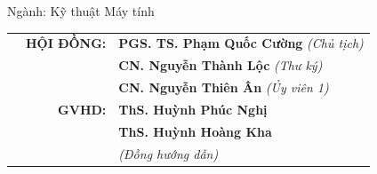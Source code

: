 \begin{titlepage}
\begin{center}
        \vspace{1em}
        
        {\fontsize{15pt}{18pt}\selectfont Ngành: Kỹ thuật Máy tính}

        \vspace{1cm}

        \begin{table}[h]
            \centering
            \fontsize{15pt}{18pt}\selectfont
            \begin{tabular}{p{4cm} r l}
                & \textbf{HỘI ĐỒNG:} & \textbf{PGS. TS. Phạm Quốc Cường} \textit{(Chủ tịch)} \\
                & & \textbf{CN. Nguyễn Thành Lộc} \textit{(Thư ký)} \\
                & & \textbf{CN. Nguyễn Thiên Ân} \textit{(Ủy viên 1)} \\
                & \textbf{GVHD:} & \textbf{ThS. Huỳnh Phúc Nghị} \\
                & & \textbf{ThS. Huỳnh Hoàng Kha} \\
                & & \textit{(Đồng hướng dẫn)} \\

\end{tabular}
\end{table}
\end{center}
\end{titlepage}
